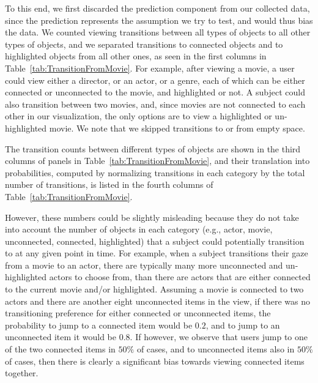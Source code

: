 To this end, we first discarded the prediction component from our collected data, since the prediction represents the assumption we try to test, and would thus bias the data. We counted viewing transitions between all types of objects to all other types of objects, and we separated transitions to connected objects and to highlighted objects from all other ones, as seen in the first columns in Table~\ref{tab:TransitionFromMovie}.  For example, after viewing a movie, a user could view either a director, or an actor, or a genre, each of which can be either connected or unconnected to the movie, and highlighted or not. A subject could also transition between two movies, and, since movies are not connected to each other in our visualization, the only options are to view a highlighted or un-highlighted movie.  We note that we skipped transitions to or from empty space.  

The transition counts between different types of objects are shown in the third columns of panels in Table~\ref{tab:TransitionFromMovie}, and their translation into probabilities, computed by normalizing transitions in each category by the total number of transitions, is listed in the fourth columns of Table~\ref{tab:TransitionFromMovie}. 

However, these numbers could be slightly misleading because they do not take into account the number of objects in each category (e.g., actor, movie, unconnected, connected, highlighted) that a  subject could potentially transition to at any given point in time. For example, when a subject transitions their gaze from a movie to an actor, there are typically many more unconnected and un-highlighted actors to choose from, than there are actors that are either connected to the current movie and/or highlighted. Assuming a movie is connected to two actors and there are another eight unconnected items in the view, if there was no transitioning preference for either connected or unconnected items, the probability to jump to a connected item would be $0.2$, and to jump to an unconnected item it would be $0.8$. If however, we observe that users jump to one of the two connected items in $50\%$ of cases, and to unconnected items also in $50\%$ of cases, then there is clearly a significant bias towards viewing connected items together.

